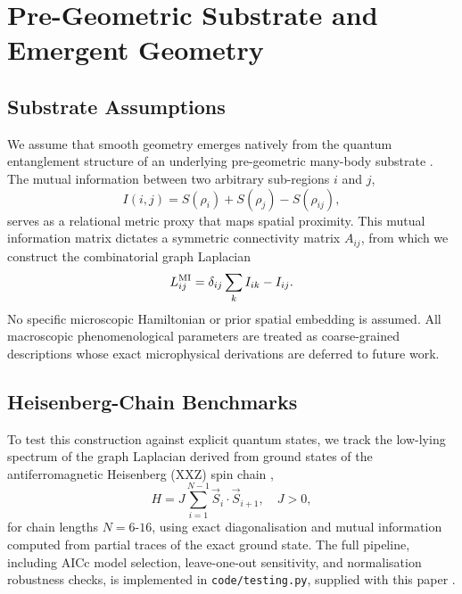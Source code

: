 \documentclass[reprint,superscriptaddress,amsmath,amssymb,aps,prd,showkeys,nofootinbib]{revtex4-2}
\begin{document}
\section{Pre-Geometric Substrate and Emergent Geometry}

\subsection{Substrate Assumptions}
We assume that smooth geometry emerges natively from the quantum entanglement structure of
an underlying pre-geometric many-body substrate \cite{VanRaamsdonk2010, RyuTakayanagi2006,
MaldacenaSusskind2013}. The mutual
information between two arbitrary sub-regions $i$ and $j$,
\begin{equation}
I(i,j) = S(\rho_i) + S(\rho_j) - S(\rho_{ij}),
\end{equation}
serves as a relational metric proxy that maps spatial proximity. This mutual information
matrix dictates a symmetric connectivity matrix $A_{ij}$, from which we construct the
combinatorial graph Laplacian
\begin{equation}
L^{\rm MI}_{ij} = \delta_{ij}\sum_k I_{ik} - I_{ij}.
\end{equation}
No specific microscopic Hamiltonian or prior spatial embedding is assumed. All macroscopic
phenomenological parameters are treated as coarse-grained descriptions whose exact
microphysical derivations are deferred to future work.

\subsection{Heisenberg-Chain Benchmarks}
\label{sec:heisenberg}
To test this construction against explicit quantum states, we track the low-lying spectrum
of the graph Laplacian derived from ground states of the antiferromagnetic Heisenberg (XXZ)
spin chain \cite{CodeRepo},
\begin{equation}
H = J\sum_{i=1}^{N-1}\vec{S}_i\cdot\vec{S}_{i+1},\quad J>0,
\end{equation}
for chain lengths $N=6$-$16$, using exact diagonalisation and mutual information computed
from partial traces of the exact ground state. The full pipeline, including AICc model
selection, leave-one-out sensitivity, and normalisation robustness checks, is implemented
in \texttt{code/testing.py}, supplied with this paper \cite{CodeRepo}.
\end{document}
